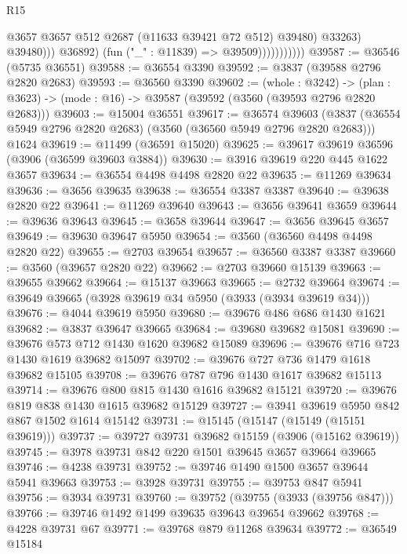 \begin{lexlean}{R15}
\begin{coremodule}
                                    @3657
                                    @3657
                                    @512
                                    @2687
                                    (@11633 @39421 @72 @512)
                                    @39480)
                                  @33263)
                                @39480)))
                          @36892)
                        (fun ("_" : @11839) => @39509)))))))))))
@39587 := @36546 (@5735 @36551)
@39588 := @36554 @3390
@39592 := @3837 (@39588 @2796 @2820 @2683)
@39593 := @36560 @3390
@39602 := (whole : @3242) ->
  (plan : @3623) -> (mode : @16) -> @39587 (@39592 (@3560 (@39593 @2796 @2820 @2683)))
@39603 := @15004 @36551
@39617 := @36574
    @39603
    (@3837 (@36554 @5949 @2796 @2820 @2683) (@3560 (@36560 @5949 @2796 @2820 @2683)))
    @1624
@39619 := @11499 (@36591 @15020)
@39625 := @39617 @39619 @36596 (@3906 (@36599 @39603 @3884))
@39630 := @3916 @39619 @220 @445 @1622 @3657
@39634 := @36554 @4498 @4498 @2820 @22
@39635 := @11269 @39634
@39636 := @3656 @39635
@39638 := @36554 @3387 @3387
@39640 := @39638 @2820 @22
@39641 := @11269 @39640
@39643 := @3656 @39641 @3659
@39644 := @39636 @39643
@39645 := @3658 @39644
@39647 := @3656 @39645 @3657
@39649 := @39630 @39647 @5950
@39654 := @3560 (@36560 @4498 @4498 @2820 @22)
@39655 := @2703 @39654
@39657 := @36560 @3387 @3387
@39660 := @3560 (@39657 @2820 @22)
@39662 := @2703 @39660 @15139
@39663 := @39655 @39662
@39664 := @15137 @39663
@39665 := @2732 @39664
@39674 := @39649 @39665 (@3928 @39619 @34 @5950 (@3933 (@3934 @39619 @34)))
@39676 := @4044 @39619 @5950
@39680 := @39676 @486 @686 @1430 @1621
@39682 := @3837 @39647 @39665
@39684 := @39680 @39682 @15081
@39690 := @39676 @573 @712 @1430 @1620 @39682 @15089
@39696 := @39676 @716 @723 @1430 @1619 @39682 @15097
@39702 := @39676 @727 @736 @1479 @1618 @39682 @15105
@39708 := @39676 @787 @796 @1430 @1617 @39682 @15113
@39714 := @39676 @800 @815 @1430 @1616 @39682 @15121
@39720 := @39676 @819 @838 @1430 @1615 @39682 @15129
@39727 := @3941 @39619 @5950 @842 @867 @1502 @1614 @15142
@39731 := @15145 (@15147 (@15149 (@15151 @39619)))
@39737 := @39727 @39731 @39682 @15159 (@3906 (@15162 @39619))
@39745 := @3978 @39731 @842 @220 @1501 @39645 @3657 @39664 @39665
@39746 := @4238 @39731
@39752 := @39746 @1490 @1500 @3657 @39644 @5941 @39663
@39753 := @3928 @39731
@39755 := @39753 @847 @5941
@39756 := @3934 @39731
@39760 := @39752 (@39755 (@3933 (@39756 @847)))
@39766 := @39746 @1492 @1499 @39635 @39643 @39654 @39662
@39768 := @4228 @39731 @67
@39771 := @39768 @879 @11268 @39634
@39772 := @36549 @15184

\end{coremodule}
\end{lexlean}

